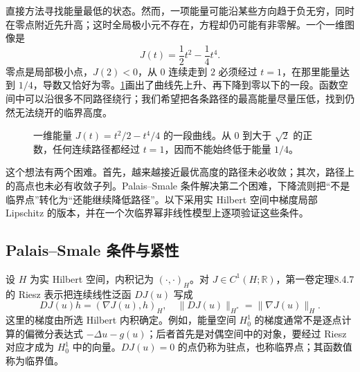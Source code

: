 
直接方法寻找能量最低的状态。然而，一项能量可能沿某些方向趋于负无穷，同时在零点附近先升高；这时全局极小元不存在，方程却仍可能有非零解。一个一维图像是
\[
 J(t)=\frac12t^2-\frac14t^4.
\]
零点是局部极小点，\(J(2)<0\)，从 \(0\) 连续走到 \(2\) 必须经过 \(t=1\)，在那里能量达到 \(1/4\)，导数又恰好为零。\cref{b2:fig:14-mountain-profile}画出了曲线先上升、再下降到零以下的一段。函数空间中可以沿很多不同路径绕行；我们希望把各条路径的最高能量尽量压低，找到仍然无法绕开的临界高度。

\begin{figure}[htbp]
\centering
{}
\caption[一维能量的山口图像]{一维能量 \(J(t)=t^2/2-t^4/4\) 的一段曲线。从 \(0\) 到大于 \(\sqrt2\) 的正数，任何连续路径都经过 \(t=1\)，因而不能始终低于能量 \(1/4\)。}
\label{b2:fig:14-mountain-profile}
\end{figure}

这个想法有两个困难。首先，越来越接近最优高度的路径未必收敛；其次，路径上的高点也未必有收敛子列。Palais–Smale 条件解决第二个困难，下降流则把“不是临界点”转化为“还能继续降低路径”。以下采用实 Hilbert 空间中梯度局部 Lipschitz 的版本，并在一个次临界幂非线性模型上逐项验证这些条件。

\subsection{Palais–Smale 条件与紧性}
\label{b2:subsec:140501}

设 \(H\) 为实 Hilbert 空间，内积记为 \((\cdot,\cdot)_H\)。对 \(J\in C^1(H;\mathbb R)\)，第一卷定理8.4.7的 Riesz 表示把连续线性泛函 \(DJ(u)\) 写成
\[
 DJ(u)h=(\nabla J(u),h)_H,
 \quad \|DJ(u)\|_{H^*}=\|\nabla J(u)\|_H.
\]
这里的梯度由所选 Hilbert 内积确定。例如，能量空间 \(H_0^1\) 的梯度通常不是逐点计算的偏微分表达式 \(-\Delta u-g(u)\)；后者首先是对偶空间中的对象，要经过 Riesz 对应才成为 \(H_0^1\) 中的向量。\(DJ(u)=0\) 的点仍称为驻点，也称临界点；其函数值称为临界值。

